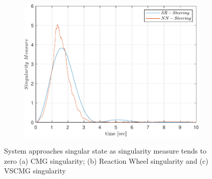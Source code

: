 \begin{figure}[ht]
\begin{subfigure}[b]{0.3\textwidth}
         \centering
         \includegraphics[width=\textwidth]{figures/plots/Results/vs-vs-QQ.pdf}
          \caption{}
        \label{fig:nnvscmg_QQ}
     \end{subfigure}
        \caption{System approaches singular state as singularity measure tends to zero (a) CMG singularity; (b) Reaction Wheel singularity and (c) VSCMG singularity}
        \label{fig:nnvscmg_sings}
\end{figure}

